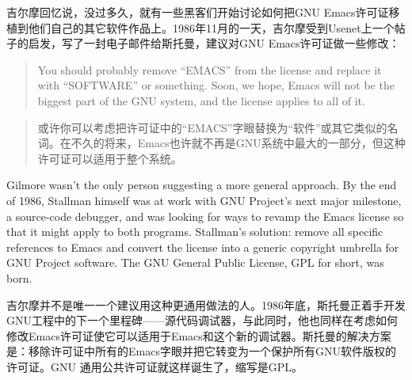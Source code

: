 \ifdefined\chs
吉尔摩回忆说，没过多久，就有一些黑客们开始讨论如何把GNU Emacs许可证移植到他们自己的其它软件作品上。1986年11月的一天，吉尔摩受到Usenet上一个帖子的启发，写了一封电子邮件给斯托曼，建议对GNU Emacs许可证做一些修改：
\fi

\ifdefined\eng
\begin{quote}
You should probably remove ``EMACS'' from the license and replace it with ``SOFTWARE'' or something. Soon, we hope, Emacs will not be the biggest part of the GNU system, and the license applies to all of it.
\end{quote}
\fi

\ifdefined\chs
\begin{quote}
或许你可以考虑把许可证中的``EMACS''字眼替换为``软件''或其它类似的名词。在不久的将来，Emacs也许就不再是GNU系统中最大的一部分，但这种许可证可以适用于整个系统。 
\end{quote}
\fi

\ifdefined\eng
Gilmore wasn't the only person suggesting a more general approach. By the end of 1986, Stallman himself was at work with GNU Project's next major milestone, a source-code debugger, and was looking for ways to revamp the Emacs license so that it might apply to both programs. Stallman's solution: remove all specific references to Emacs and convert the license into a generic copyright umbrella for GNU Project software. The GNU General Public License, GPL for short, was born.
\fi

\ifdefined\chs
吉尔摩并不是唯一一个建议用这种更通用做法的人。1986年底，斯托曼正着手开发GNU工程中的下一个里程碑——源代码调试器，与此同时，他也同样在考虑如何修改Emacs许可证使它可以适用于Emacs和这个新的调试器。斯托曼的解决方案是：移除许可证中所有的Emacs字眼并把它转变为一个保护所有GNU软件版权的许可证。GNU 通用公共许可证就这样诞生了，缩写是GPL。
\fi

